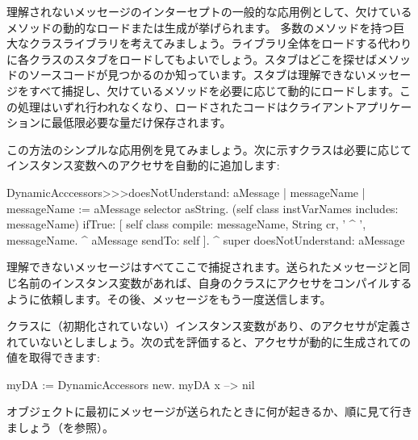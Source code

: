 \documentclass[a4paper,10pt,twoside]{book}
\begin{document}
理解されないメッセージのインターセプトの一般的な応用例として、欠けているメソッドの動的なロードまたは生成が挙げられます。
多数のメソッドを持つ巨大なクラスライブラリを考えてみましょう。ライブラリ全体をロードする代わりに各クラスのスタブをロードしてもよいでしょう。スタブはどこを探せばメソッドのソースコードが見つかるのか知っています。スタブは理解できないメッセージをすべて捕捉し、欠けているメソッドを必要に応じて動的にロードします。この処理はいずれ行われなくなり、ロードされたコードはクライアントアプリケーションに最低限必要な量だけ保存されます。


この方法のシンプルな応用例を見てみましょう。次に示すクラスは必要に応じてインスタンス変数へのアクセサを自動的に追加します:

\begin{code}{}
DynamicAcccessors>>>doesNotUnderstand: aMessage
	| messageName |
	messageName := aMessage selector asString.
	(self class instVarNames includes: messageName)
		ifTrue: [
			self class compile: messageName, String cr, ' ^ ', messageName.
			^ aMessage sendTo: self ].
	^ super doesNotUnderstand: aMessage
\end{code}
理解できないメッセージはすべてここで捕捉されます。送られたメッセージと同じ名前のインスタンス変数があれば、自身のクラスにアクセサをコンパイルするように依頼します。その後、メッセージをもう一度送信します。

クラスに（初期化されていない）インスタンス変数があり、のアクセサが定義されていないとしましょう。次の式を評価すると、アクセサが動的に生成されての値を取得できます:
\begin{code}{}
myDA := DynamicAccessors new.
myDA x --> nil
\end{code}

オブジェクトに最初にメッセージが送られたときに何が起きるか、順に見て行きましょう（を参照）。
\end{document}
